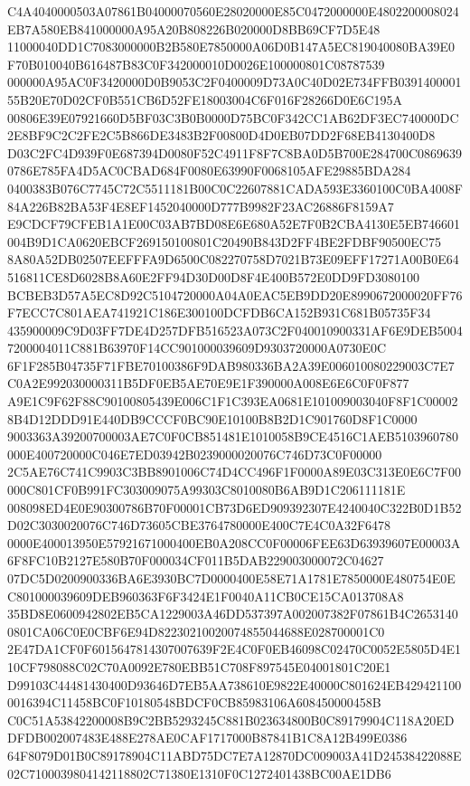 \documentclass[UTF8,fontset=fandol,zihao=-4,a4paper]{ctexart}
\begin{document}
{{C4A4040000503A07861B04000070560E28020000E85C0472000000E4802200008024EB7A580EB841000000A95A20B808226B020000D8BB69CF7D5E48
11000040DD1C7083000000B2B580E7850000A06D0B147A5EC819040080BA39E0F70B010040B616487B83C0F342000010D0026E100000801C08787539
000000A95AC0F3420000D0B9053C2F0400009D73A0C40D02E734FFB039140000155B20E70D02CF0B551CB6D52FE18003004C6F016F28266D0E6C195A
00806E39E07921660D5BF03C3B0B0000D75BC0F342CC1AB62DF3EC740000DC2E8BF9C2C2FE2C5B866DE3483B2F00800D4D0EB07DD2F68EB4130400D8
D03C2FC4D939F0E687394D0080F52C4911F8F7C8BA0D5B700E284700C08696390786E785FA4D5AC0CBAD684F0080E63990F0068105AFE29885BDA284
0400383B076C7745C72C5511181B00C0C22607881CADA593E3360100C0BA4008F84A226B82BA53F4E8EF1452040000D777B9982F23AC26886F8159A7
E9CDCF79CFEB1A1E00C03AB7BD08E6E680A52E7F0B2CBA4130E5EB746601004B9D1CA0620EBCF269150100801C20490B843D2FF4BE2FDBF90500EC75
8A80A52DB02507EEFFFA9D6500C082270758D7021B73E09EFF17271A00B0E64516811CE8D6028B8A60E2FF94D30D00D8F4E400B572E0DD9FD3080100
BCBEB3D57A5EC8D92C5104720000A04A0EAC5EB9DD20E8990672000020FF76F7ECC7C801AEA741921C186E300100DCFDB6CA152B931C681B05735F34
435900009C9D03FF7DE4D257DFB516523A073C2F040010900331AF6E9DEB50047200004011C881B63970F14CC901000039609D9303720000A0730E0C
6F1F285B04735F71FBE70100386F9DAB980336BA2A39E006010080229003C7E7C0A2E992030000311B5DF0EB5AE70E9E1F390000A008E6E6C0F0F877
A9E1C9F62F88C90100805439E006C1F1C393EA0681E101009003040F8F1C000028B4D12DDD91E440DB9CCCF0BC90E10100B8B2D1C901760D8F1C0000
9003363A39200700003AE7C0F0CB851481E1010058B9CE4516C1AEB5103960780000E400720000C046E7ED03942B0239000020076C746D73C0F00000
2C5AE76C741C9903C3BB8901006C74D4CC496F1F0000A89E03C313E0E6C7F00000C801CF0B991FC303009075A99303C8010080B6AB9D1C206111181E
008098ED4E0E90300786B70F00001CB73D6ED909392307E4240040C322B0D1B52D02C3030020076C746D73605CBE3764780000E400C7E4C0A32F6478
0000E400013950E57921671000400EB0A208CC0F00006FEE63D63939607E00003A6F8FC10B2127E580B70F000034CF011B5DAB229003000072C04627
07DC5D0200900336BA6E3930BC7D0000400E58E71A1781E7850000E480754E0EC801000039609DEB960363F6F3424E1F0040A11CB0CE15CA013708A8
35BD8E0600942802EB5CA1229003A46DD537397A002007382F07861B4C26531400801CA06C0E0CBF6E94D82230210020074855044688E028700001C0
2E47DA1CF0F6015647814307007639F2E4C0F0EB46098C02470C0052E5805D4E110CF798088C02C70A0092E780EBB51C708F897545E04001801C20E1
D99103C44481430400D93646D7EB5AA738610E9822E40000C801624EB4294211000016394C11458BC0F10180548BDCF0CB85983106A608450000458B
C0C51A53842200008B9C2BB5293245C881B023634800B0C89179904C118A20EDDFDB002007483E488E278AE0CAF1717000B87841B1C8A12B499E0386
64F8079D01B0C89178904C11ABD75DC7E7A12870DC009003A41D24538422088E02C7100039804142118802C71380E1310F0C1272401438BC00AE1DB6
}}
\end{document}
